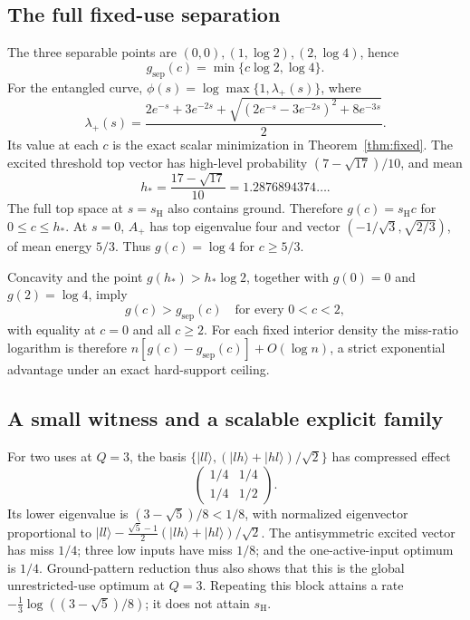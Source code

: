 \documentclass[11pt,a4paper]{article}
\theoremstyle{remark}
\newcommand{\ket}[1]{|#1\rangle}
\newcommand{\sh}{s_{\mathrm H}}
\newcommand{\gs}{g_{\mathrm{sep}}}
\begin{document}
\subsection{The full fixed-use separation}
The three separable points are \((0,0),(1,\log2),(2,\log4)\), hence
\[
 \gs(c)=\min\{c\log2,\log4\}.
\]
For the entangled curve, \(\phi(s)=\log\max\{1,\lambda_+(s)\}\), where
\[
 \lambda_+(s)=\frac{2e^{-s}+3e^{-2s}
 +\sqrt{(2e^{-s}-3e^{-2s})^2+8e^{-3s}}}{2}.
\]
Its value at each \(c\) is the exact scalar minimization in
Theorem~\ref{thm:fixed}. The excited threshold top vector has high-level
probability \((7-\sqrt{17})/10\), and mean
\[
 h_*=\frac{17-\sqrt{17}}{10}=1.2876894374\ldots .
\]
The full top space at \(s=\sh\) also contains ground. Therefore
\(g(c)=\sh c\) for \(0\leq c\leq h_*\).
At \(s=0\), \(A_+\) has top eigenvalue four and vector
\((-1/\sqrt3,\sqrt{2/3})\), of mean energy \(5/3\).
Thus \(g(c)=\log4\) for \(c\geq5/3\).

Concavity and the point \(g(h_*)>\!h_*\log2\), together with
\(g(0)=0\) and \(g(2)=\log4\), imply
\begin{equation}\label{eq:qcurvegap}
 g(c)>\gs(c)\quad\text{for every }0<c<2,
\end{equation}
with equality at \(c=0\) and all \(c\geq2\).
For each fixed interior density the miss-ratio logarithm is therefore
\(n[g(c)-\gs(c)]+O(\log n)\), a strict exponential advantage under an
exact hard-support ceiling.

\subsection{A small witness and a scalable explicit family}
For two uses at \(Q=3\), the basis
\(\{\ket{ll},(\ket{lh}+\ket{hl})/\sqrt2\}\) has compressed effect
\[
 \begin{pmatrix}1/4&1/4\\1/4&1/2\end{pmatrix}.
\]
Its lower eigenvalue is \((3-\sqrt5)/8<1/8\), with normalized eigenvector
proportional to
\(\ket{ll}-\frac{\sqrt5-1}{2}(\ket{lh}+\ket{hl})/\sqrt2\).
The antisymmetric excited vector has miss \(1/4\); three low inputs have
miss \(1/8\); and the one-active-input optimum is \(1/4\).
Ground-pattern reduction thus also shows that this is the global
unrestricted-use optimum at \(Q=3\).
Repeating this block attains a rate
\(-\frac13\log((3-\sqrt5)/8)\); it does not attain \(\sh\).
\end{document}
